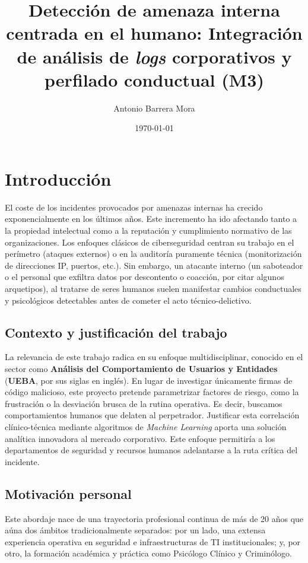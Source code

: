 \documentclass[IB]{TFUOC}%
\title{Detección de amenaza interna centrada en el humano: Integración de análisis de \textit{logs} corporativos y perfilado conductual (M3)}
\author{Antonio Barrera Mora}
\date{\today}
\begin{document}
\estructura

\tableofcontents

\listoffigures

\listoftables




\chapter{Introducción}

El coste de los incidentes provocados por amenazas internas ha crecido exponencialmente en los últimos años. Este incremento ha ido afectando tanto a la propiedad intelectual como a la reputación y cumplimiento normativo de las organizaciones. Los enfoques clásicos de ciberseguridad centran su trabajo en el perímetro (ataques externos) o en la auditoría puramente técnica (monitorización de direcciones IP, puertos, etc.). Sin embargo, un atacante interno (un saboteador o el personal que exfiltra datos por descontento o coacción, por citar algunos arquetipos), al tratarse de seres humanos suelen manifestar cambios conductuales y psicológicos detectables antes de cometer el acto técnico-delictivo.

\section{Contexto y justificación del trabajo}

La relevancia de este trabajo radica en su enfoque multidisciplinar, conocido en el sector como \textbf{Análisis del Comportamiento de Usuarios y Entidades} (\textbf{UEBA}, por sus siglas en inglés). En lugar de investigar únicamente firmas de código malicioso, este proyecto pretende parametrizar factores de riesgo, como la frustración o la desviación brusca de la rutina operativa. Es decir, buscamos comportamientos humanos que delaten al perpetrador. Justificar esta correlación clínico-técnica mediante algoritmos de \textit{Machine Learning} aporta una solución analítica innovadora al mercado corporativo. Este enfoque permitiría a los departamentos de seguridad y recursos humanos adelantarse a la ruta crítica del incidente.


\section{Motivación personal}
Este abordaje nace de una trayectoria profesional continua de más de 20 años que aúna dos ámbitos tradicionalmente separados: por un lado, una extensa experiencia operativa en seguridad e infraestructuras de TI institucionales; y, por otro, la formación académica y práctica como Psicólogo Clínico y Criminólogo. 
\end{document}
